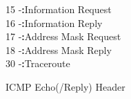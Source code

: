 \documentclass[a4paper,12pt]{article}
\begin{document}
\begin{figure}[H]
			\hspace{6.7mm}15 \hspace{2mm}			-\hspace{8.9mm}\textbf{:}\hspace{2.4mm}Information Request\\
			
			\hspace{6.7mm}16 \hspace{2mm}			-\hspace{8.9mm}\textbf{:}\hspace{2.4mm}Information Reply\\
						
			\hspace{6.7mm}17 \hspace{2mm}			-\hspace{8.9mm}\textbf{:}\hspace{2.4mm}Address Mask Request\\
						
			\hspace{6.7mm}18 \hspace{2mm}			-\hspace{8.9mm}\textbf{:}\hspace{2.4mm}Address Mask Reply\\
			
			\hspace{6.7mm}30 \hspace{2mm}			-\hspace{8.9mm}\textbf{:}\hspace{2.4mm}Traceroute\\
			\fi
			\caption{ICMP Echo(/Reply) Header}
				\label{fig:ICMPPack}
			\end{figure}
\newpage
{}
\end{document}
